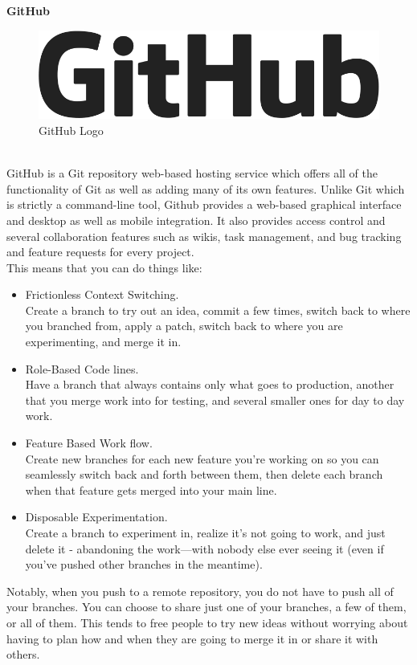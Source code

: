 \noindent\textbf{GitHub}
\begin{figure}[h]
	\centering\includegraphics[scale=0.40]{images/github_logo.png}
	\caption{GitHub Logo}
\end{figure}\\GitHub is a Git repository web-based hosting service which offers all of the functionality of Git as well as adding many of its own features. Unlike Git which is strictly a command-line tool, Github provides a web-based graphical interface and desktop as well as mobile integration. It also provides access control and several collaboration features such as wikis, task management, and bug tracking and feature requests for every project.\\
This means that you can do things like:
\begin{itemize}
	\item Frictionless Context Switching.\\ Create a branch to try out an
	idea, commit a few times, switch back to where you branched from,
	apply a patch, switch back to where you are experimenting, and merge
	it in.
	\item Role-Based Code lines. \\ Have a branch that always contains only
	what goes to production, another that you merge work into for testing,
	and several smaller ones for day to day work.
	\item Feature Based Work flow. \\ Create new branches for each new
	feature you're working on so you can seamlessly switch back and forth
	between them, then delete each branch when that feature gets merged
	into your main line.
	\item Disposable Experimentation.\\  Create a branch to experiment in,
	realize it's not going to work, and just delete it - abandoning the
	work—with nobody else ever seeing it (even if you've pushed other
	branches in the meantime).
\end{itemize}
Notably, when you push to a remote repository, you do not have to push
all of your branches. You can choose to share just one of your
branches, a few of them, or all of them. This tends to free people to
try new ideas without worrying about having to plan how and when they
are going to merge it in or share it with others.
\pagebreak

